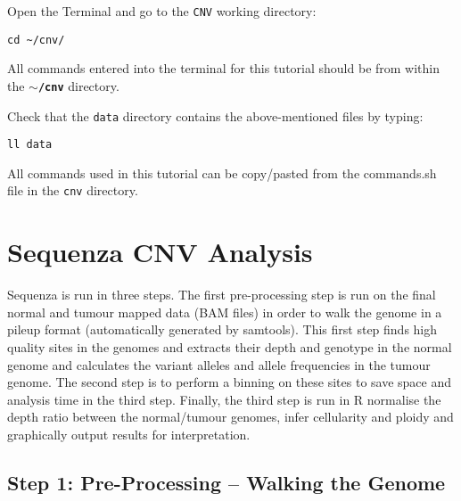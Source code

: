 \begin{steps}
Open the Terminal and go to the \texttt{CNV} working directory:
\begin{lstlisting}
cd ~/cnv/
\end{lstlisting}
\end{steps}

\begin{warning}
  All commands entered into the terminal for this tutorial should be from within the
  \textbf{\texttt{$\sim$/cnv}} directory.
\end{warning}

\begin{steps}
Check that the \texttt{data} directory contains the above-mentioned files by typing:
\begin{lstlisting}
ll data
\end{lstlisting}
\end{steps}

All commands used in this tutorial can be copy/pasted from the commands.sh file in the \texttt{cnv} directory.


\section{Sequenza CNV Analysis}

Sequenza is run in three steps. The first pre-processing step is run on the final normal and tumour mapped data (BAM files) in order to walk the genome in a pileup format (automatically generated by samtools). This first step finds high quality sites in the genomes and extracts their depth and genotype in the normal genome and calculates the variant alleles and allele frequencies in the tumour genome. The second step is to perform a binning on these sites to save space and analysis time in the third step. Finally, the third step is run in R normalise the depth ratio between the normal/tumour genomes, infer cellularity and ploidy and graphically output results for interpretation.


\subsection{Step 1: Pre-Processing -- Walking the Genome}

